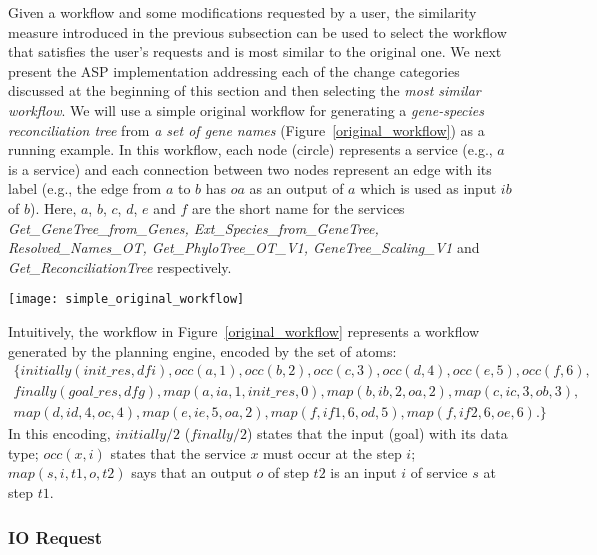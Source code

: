 \documentclass{new_tlp}
\begin{document}
{Given a workflow and some modifications requested by a user, the similarity measure introduced in the previous subsection can be used to select the 
workflow that satisfies the user's requests and is most similar to the original one. 
We next present the ASP implementation addressing each of the change categories discussed at the beginning of this section and then selecting the 
\emph{most similar workflow}. 
We will use a simple original workflow for generating a \emph{gene-species reconciliation tree} from \emph{a set of gene names} (Figure~\ref{original_workflow}) as a running example. In this workflow,  each node (circle) represents a service (e.g., $a$ is a service) and each connection between two nodes represent an edge with its label 
(e.g., the edge from $a$ to $b$ has $oa$ as an output of $a$ which is used as input $ib$ of $b$). Here,
$a$, $b$, $c$, $d$, $e$ and $f$ are the short name for the services  \emph{Get\_GeneTree\_from\_Genes, Ext\_Species\_from\_GeneTree, Resolved\_Names\_OT, Get\_PhyloTree\_OT\_V1, GeneTree\_Scaling\_V1} and 
\emph{Get\_ReconciliationTree} respectively. 
\begin{figure*}[h]
		\centerline{\texttt{[image: simple\_original\_workflow]}}
	\caption{Original workflow}
	\label{original_workflow}
\end{figure*}
%
 
Intuitively, the workflow in Figure~\ref{original_workflow} represents a workflow generated by the planning engine, encoded   by the set of atoms: 
\begin{align*} 
 \{initially(init\_res,dfi),occ(a,1), occ(b,2),occ(c,3), occ(d,4), 
  occ(e,5),occ(f,6), \\ finally(goal\_res,dfg), map(a,ia,1,init\_res,0), 
 map(b,ib,2,oa,2), map(c,ic,3,ob,3), \\ 
 map(d,id,4,oc,4), 
 map(e,ie,5,oa,2), map(f,if1,6,od,5), map(f,if2,6,oe,6).\}
\end{align*} 
In this encoding, $initially/2$ ($finally/2$) states that the input (goal) with its data type; $occ(x,i)$ states that the service $x$ must occur at the step 
$i$; $map(s, i, t1, o, t2)$ says that an output $o$ of step $t2$ is an input $i$ of service $s$ at step $t1$.
\subsubsection{IO Request}



}
\end{document}
